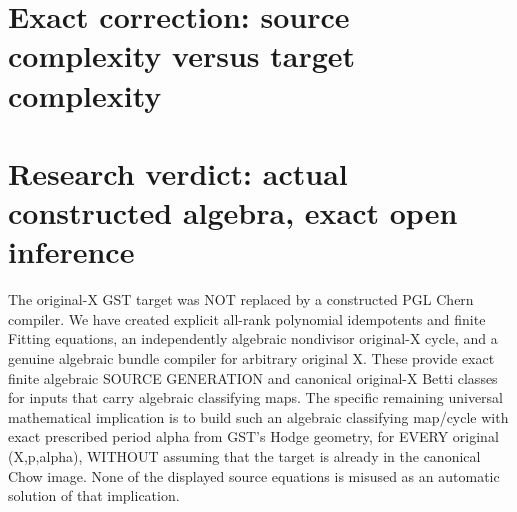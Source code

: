 \documentclass[11pt]{article}
\begin{document}
\section{Exact correction: source complexity versus target complexity}
\section{Research verdict: actual constructed algebra, exact open inference}
The original-X GST target was
NOT replaced by a constructed
PGL Chern compiler. We have
created explicit
all-rank polynomial idempotents
and finite Fitting equations,
an independently algebraic
nondivisor original-X cycle,
and a genuine algebraic
bundle compiler for
arbitrary original X.
These provide exact
finite algebraic
SOURCE GENERATION and
canonical original-X
Betti classes for inputs
that carry algebraic
classifying maps.
The specific remaining
universal mathematical
implication is to build
such an algebraic
classifying map/cycle
with exact prescribed
period alpha from
GST's Hodge geometry,
for EVERY original
(X,p,alpha), WITHOUT
assuming that the
target is already in
the canonical Chow
image. None of the
displayed source
equations is misused
as an automatic
solution of that
implication.
\end{document}
